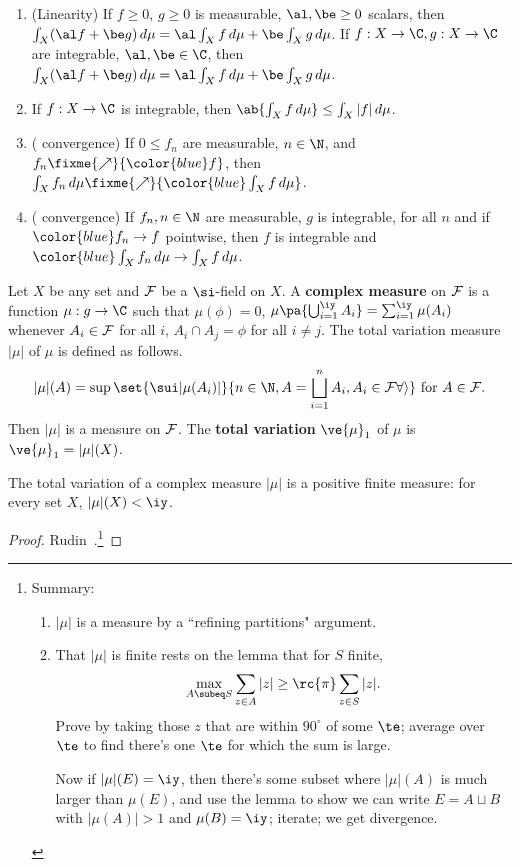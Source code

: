 \begin{pr}
\begin{enumerate}
\item
(Linearity) If $f\ge 0$, $g\ge 0$ is measurable, $\al,\be\ge 0$ scalars, then $\int_X(\al f+\be g)\,d\mu=\al\int_X f\,d\mu+\be\int_Xg\,d\mu$. If $f:X\to \C,g:X\to \C$ are integrable, $\al,\be\in \C$, then $\int_X (\al f+\be g)\,d\mu=\al\int_X f\,d\mu+\be \int_X g\,d\mu$. 
\item
If $f:X\to \C$ is integrable, then $\ab{\int_X f\,d\mu}\le \int_X|f|\,d\mu$.
\item
( {\color{blue}convergence}) If $0\le f_n$ are measurable, $n\in \N$, and $f_n\fixme{\nearrow} {\color{blue}f}$, then $\int_X f_n\,d\mu\fixme{\nearrow} {\color{blue}\int_X f\,d\mu}$.
\item
( {\color{blue}convergence}) If $f_n,n\in \N$ are measurable, $g$ is integrable,  for all $n$ and if ${\color{blue}f_n\to f}$ pointwise, then $f$ is integrable and ${\color{blue}\int_X f_n\,d\mu\to \int_X f\,d\mu}$.
\end{enumerate}
\end{pr}
\begin{df}
Let $X$ be any set and $\cal F$ be a $\si$-field on $X$. A \textbf{complex measure} on $\cal F$ is a function $\mu:g\to \C$ such that $\mu(\phi)=0$, $\mu\pa{\bigcup_{i=1}^{\iy}A_i}=\sum_{i=1}^{\iy} \mu(A_i)$ whenever $A_i\in \cal F$ for all $i$, $A_i\cap A_j=\phi$ for all $i\ne j$. The total variation measure $|\mu|$ of $\mu$ is defined as follows. 
\[
|\mu|(A)=\sup\set{\sui |\mu(A_i)|}{n\in \N,%
A=\bigsqcup_{i=1}^n A_i,A_i\in \cal F\forall i}\text{ for }A\in \cal F.
\]
Then $|\mu|$ is a measure on $\cal F$. The \textbf{total variation} $\ve{\mu}_1$ of $\mu$ is $\ve{\mu}_1=|\mu|(X)$. 
\end{df}
\begin{thm}
The total variation of a complex measure $|\mu|$ is a positive finite measure: for every set $X$, $|\mu|(X)<\iy$. 
\end{thm}
\begin{proof}
Rudin~\cite[Theorem 6.2, 6.4]{RCA}.\footnote{Summary:
\begin{enumerate}
\item
$|\mu|$ is a measure by a ``refining partitions" argument.
\item
That $|\mu|$ is finite rests on the lemma that for $S$ finite,
\[
\max_{A\subeq S} \sum_{z\in A}|z|\ge \rc{\pi}\sum_{z\in S}|z|.
\]
Prove by taking those $z$ that are within $90^{\circ}$ of some $\te$; average over $\te$ to find there's one $\te$ for which the sum is large.

Now if $|\mu|(E)=\iy$, then there's some subset where $|\mu|(A)$ is much larger than $\mu(E)$, and use the lemma to show we can write $E=A\sqcup B$ with $|\mu(A)|>1$ and $\mu(B)=\iy$; iterate; we get divergence.
\end{enumerate}}
\end{proof}

